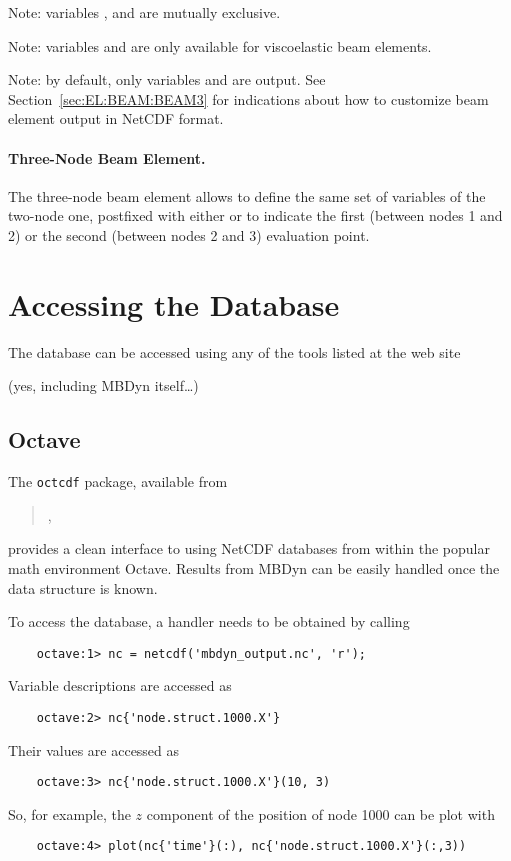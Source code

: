 Note: variables ,  and  are mutually exclusive.

Note: variables  and 
are only available for viscoelastic beam elements.

Note: by default, only variables 
and  are output.
See Section~\ref{sec:EL:BEAM:BEAM3} for indications
about how to customize beam element output in NetCDF format.

\paragraph{Three-Node Beam Element.}
The three-node beam element allows to define the same set of variables
of the two-node one, postfixed with either  or 
to indicate the first (between nodes 1 and 2)
or the second (between nodes 2 and 3)
evaluation point.






\section{Accessing the Database}
The database can be accessed using any of the tools listed at the web site
\begin{quote}
\end{quote}
(yes, including MBDyn itself\ldots)



\subsection{Octave}
The \texttt{octcdf} package, available from
\begin{quote}
,
\end{quote}
provides a clean interface to using NetCDF databases from within
the popular math environment Octave.
Results from MBDyn can be easily handled once the data structure is known.

To access the database, a handler needs to be obtained by calling
\begin{verbatim}
    octave:1> nc = netcdf('mbdyn_output.nc', 'r');
\end{verbatim}
Variable descriptions are accessed as
\begin{verbatim}
    octave:2> nc{'node.struct.1000.X'}
\end{verbatim}
Their values are accessed as
\begin{verbatim}
    octave:3> nc{'node.struct.1000.X'}(10, 3)
\end{verbatim}
So, for example, the $z$ component of the position of node 1000 can be plot with 
\begin{verbatim}
    octave:4> plot(nc{'time'}(:), nc{'node.struct.1000.X'}(:,3))
\end{verbatim}

